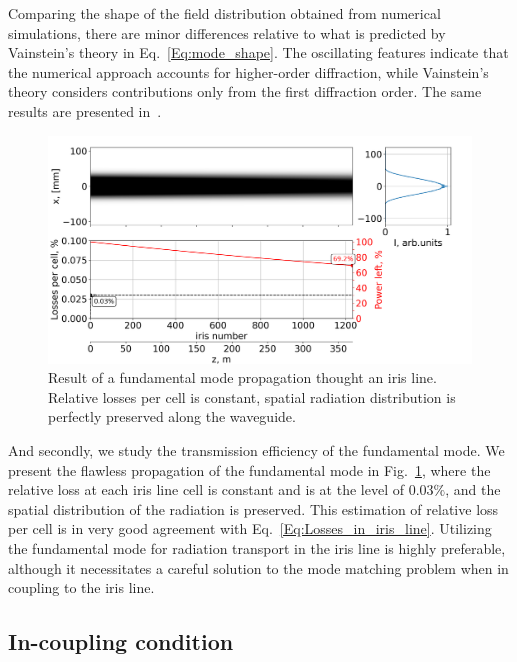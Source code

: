     Comparing the shape of the field distribution obtained from numerical simulations, there are minor differences relative to what is predicted by Vainstein's theory in Eq.~\ref{Eq:mode_shape}. The oscillating features indicate that the numerical approach accounts for higher-order diffraction, while Vainstein's theory considers contributions only from the first diffraction order. The same results are presented in~.
    
    \begin{figure}[h!]
    	\centering
    		\includegraphics[trim={0 0cm 0 0cm}, width=1.\linewidth]{content/images/transport/iris_mode.png}
    		\centering
            \captionsetup{justification=centering}
        	\caption{Result of a fundamental mode propagation thought an iris line. Relative losses per cell is constant, spatial radiation distribution is perfectly preserved along the waveguide.}
        \label{Fig:iris_mode}
    \end{figure}
    
    And secondly, we study the transmission efficiency of the fundamental mode. We present the flawless propagation of the fundamental mode in Fig.~\ref{Fig:iris_mode}, where the relative loss at each iris line cell is constant and is at the level of $0.03 \%$, and the spatial distribution of the radiation is preserved. This estimation of relative loss per cell is in very good agreement with Eq.~\ref{Eq:Losses_in_iris_line}. Utilizing the fundamental mode for radiation transport in the iris line is highly preferable, although it necessitates a careful solution to the mode matching problem when in coupling to the iris line.
    
\subsection{In-coupling condition}
    
